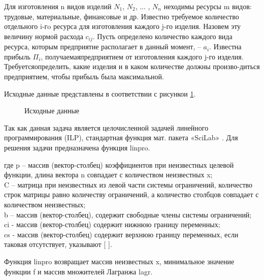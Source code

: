 \documentclass[russian,utf8,nocolumnxxxi,nocolumnxxxii]{eskdtext}
\begin{document}
Для изготовления n видов изделий $N_1$,  $N_2$, ... , $N_n$ неходимы ресурсы m видов: трудовые, материальные, финансовые и др.  Известно требуемое количество отдельного i-гo ресурса для изготовления каждого j-го изделия. Назовем эту величину нормой расхода $ c_ {ij}$. Пусть определено количество каждого вида ресурса, которым предприятие располагает в данный момент, – $a_i$. Известна прибыль $Π_i$,  получаемаяпредприятием от изготовления каждого j-го изделия. Требуетсяопределить, какие изделия и в каком количестве должны произво-диться предприятием, чтобы прибыль была максимальной.

Исходные данные представлены в соответствии с рисункои \ref{zadn1}.

\begin{figure}[h!]
\begin{center}
\caption{Исходные данные } \label{zadn1}
\end{center}
\end{figure}

Так как данная задача является целочисленной задачей линейного программирования (ILP), стандартная функция мат. пакета «SciLab» . Для решения задачи предназначена функция linpro.

где p  – массив (вектор-столбец) коэффициентов при неизвестных целевой функции, длина вектора n совпадает с количеством неизвестных x;\\
C   –  матрица при неизвестных из левой части системы ограничений,  количество строк матрицы равно количеству ограничений, а количество столбцов совпадает с количеством неизвестных;\\ 
b –  массив (вектор-столбец), содержит свободные члены системы ограничений; \\
ci - массив  (вектор-столбец) содержит нижнюю границу переменных; \\
cs - массив (вектор-столбец) содержит верхнюю границу переменных, если таковая отсутствует,  указывают [ ]. 

Функция linpro возвращает массив неизвестных x, минимальное значение функции f  и массив множителей Лагранжа lagr.
\end{document}
